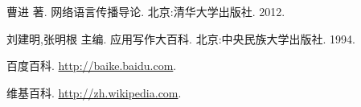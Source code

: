 \begin{thebibliography}{10}
\item 曹进 著. 网络语言传播导论. 北京:清华大学出版社. 2012.
\item 刘建明,张明根 主编. 应用写作大百科. 北京:中央民族大学出版社. 1994.
\item 百度百科. \url{http://baike.baidu.com}.
\item 维基百科. \url{http://zh.wikipedia.com}.
\end{thebibliography}
